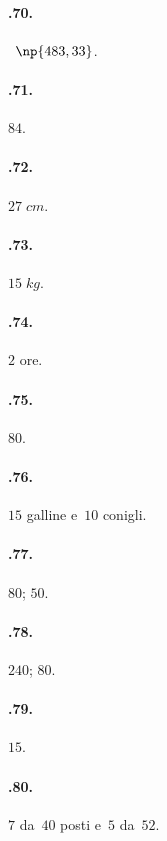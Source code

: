 \begin{multicols}{2}
\paragraph{\thechapter.70.}
\officialeuro~$\np{483,33}$.

\paragraph{\thechapter.71.}
$84$.

\paragraph{\thechapter.72.}
$27\;\unit{cm}$.

\paragraph{\thechapter.73.}
$15\;\unit{kg}$.

\paragraph{\thechapter.74.}
$2$ ore.

\paragraph{\thechapter.75.}
$80$.

\paragraph{\thechapter.76.}
$15$ galline e~$10$ conigli.

\paragraph{\thechapter.77.}
$80$; $50$.

\paragraph{\thechapter.78.}
$240$; $80$.

\paragraph{\thechapter.79.}
$15$.

\paragraph{\thechapter.80.}
$7$ da~$40$ posti e~$5$ da~$52$.


\end{multicols}

